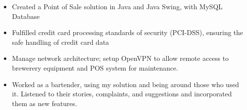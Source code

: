 \documentclass[10pt,a4paper]{altacv}
\begin{document}
\bigskip


\divider

\begin{itemize}
    \item Created a Point of Sale solution in Java and Java Swing, with MySQL Database
    \item Fulfilled credit card processing standards of security (PCI-DSS), ensuring the safe handling of credit card data
    \item Manage network architecture; setup OpenVPN to allow remote access to brewerery equipment and POS system for maintenance.
    \item Worked as a bartender, using my solution and being around those who used it. Listened to their stories, complaints, and suggestions and incorporated them as new features.
\end{itemize}

\bigskip

\end{document}
